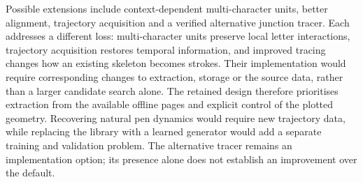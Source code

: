 Possible extensions include context-dependent multi-character units, better alignment, trajectory acquisition and a verified alternative junction tracer. Each addresses a different loss: multi-character units preserve local letter interactions, trajectory acquisition restores temporal information, and improved tracing changes how an existing skeleton becomes strokes. Their implementation would require corresponding changes to extraction, storage or the source data, rather than a larger candidate search alone.
The retained design therefore prioritises extraction from the available offline pages and explicit control of the plotted geometry. Recovering natural pen dynamics would require new trajectory data, while replacing the library with a learned generator would add a separate training and validation problem. The alternative tracer remains an implementation option; its presence alone does not establish an improvement over the default.
\FloatBarrier
